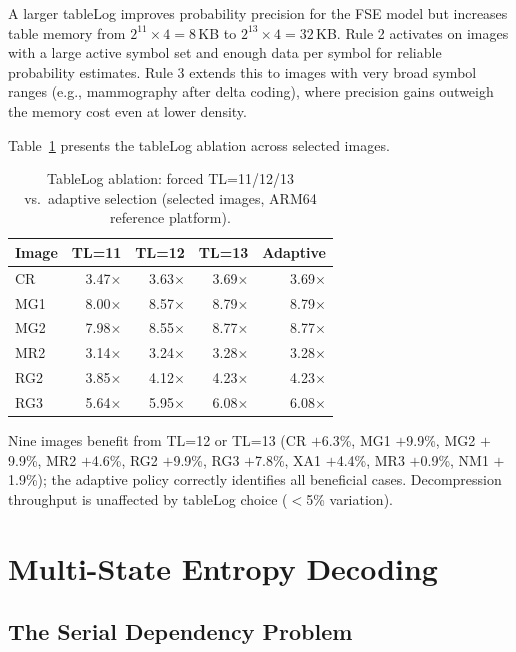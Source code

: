 \documentclass[journal]{IEEEtran}
\begin{document}
A larger tableLog improves probability precision for the FSE model but
increases table memory from $2^{11} \times 4 = 8$\,KB to $2^{13} \times 4 =
32$\,KB. Rule 2 activates on images with a large active symbol set and enough
data per symbol for reliable probability estimates. Rule 3 extends this to
images with very broad symbol ranges (e.g., mammography after delta coding),
where precision gains outweigh the memory cost even at lower density.

Table~\ref{tab:tablelog-ablation} presents the tableLog ablation across
selected images.

\begin{table}[htbp]
\centering
\caption{TableLog ablation: forced TL=11/12/13 vs.\ adaptive selection
(selected images, ARM64 reference platform).}
\label{tab:tablelog-ablation}
\scriptsize
\begin{tabular}{lrrrr}
\toprule
Image & TL=11 & TL=12 & TL=13 & Adaptive \\
\midrule
CR  & 3.47$\times$ & 3.63$\times$ & 3.69$\times$ & 3.69$\times$ \\
MG1 & 8.00$\times$ & 8.57$\times$ & 8.79$\times$ & 8.79$\times$ \\
MG2 & 7.98$\times$ & 8.55$\times$ & 8.77$\times$ & 8.77$\times$ \\
MR2 & 3.14$\times$ & 3.24$\times$ & 3.28$\times$ & 3.28$\times$ \\
RG2 & 3.85$\times$ & 4.12$\times$ & 4.23$\times$ & 4.23$\times$ \\
RG3 & 5.64$\times$ & 5.95$\times$ & 6.08$\times$ & 6.08$\times$ \\
\bottomrule
\end{tabular}
\end{table}

Nine images benefit from TL=12 or TL=13 (CR $+$6.3\%, MG1 $+$9.9\%, MG2
$+$9.9\%, MR2 $+$4.6\%, RG2 $+$9.9\%, RG3 $+$7.8\%, XA1 $+$4.4\%, MR3
$+$0.9\%, NM1 $+$1.9\%); the adaptive policy correctly identifies all
beneficial cases. Decompression throughput is unaffected by tableLog choice
($<$5\% variation).


\section{Multi-State Entropy Decoding}
\label{sec:multistate}

\subsection{The Serial Dependency Problem}
\end{document}
